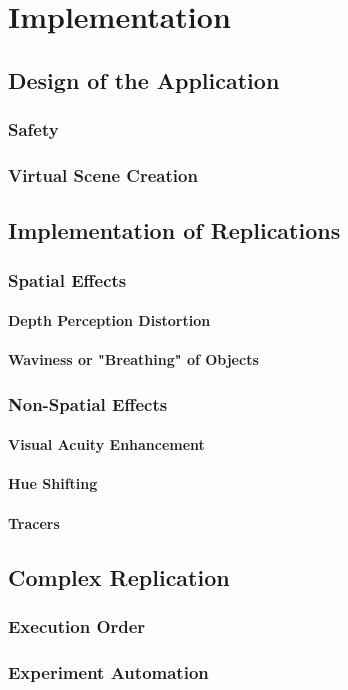 \chapter{Implementation}

\section{Design of the Application}
\subsection{Safety}
\subsection{Virtual Scene Creation}
\section{Implementation of Replications}
\subsection{Spatial Effects}
\subsubsection{Depth Perception Distortion}

\autocite{fischer1970psilocybin}

\subsubsection{Waviness or "Breathing" of Objects}
\subsection{Non-Spatial Effects}
\subsubsection{Visual Acuity Enhancement}
\subsubsection{Hue Shifting}
\subsubsection{Tracers}
\section{Complex Replication}
\subsection{Execution Order}
\subsection{Experiment Automation}\label{sec:experiment_automation}
